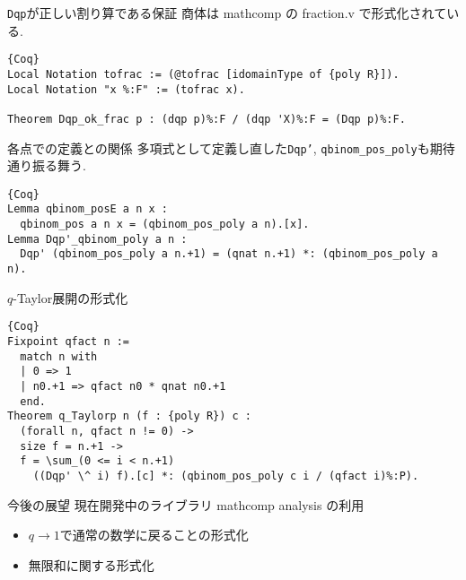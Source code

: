 \documentclass[unicode,mathserif]{beamer}
\begin{document}
\begin{frame}[fragile]
\begin{columns}[T]
\begin{column}{0.33\columnwidth}
\begin{block}{{\tt Dqp}が正しい割り算である保証}
			商体は mathcomp の fraction.v で形式化されている. 
			\begin{lstlisting}{Coq}
Local Notation tofrac := (@tofrac [idomainType of {poly R}]).
Local Notation "x %:F" := (tofrac x).

Theorem Dqp_ok_frac p : (dqp p)%:F / (dqp 'X)%:F = (Dqp p)%:F.
\end{lstlisting}
		\end{block}

		\begin{block}{各点での定義との関係}
			多項式として定義し直した{\tt Dqp'}, {\tt qbinom\_pos\_poly}も期待通り振る舞う.
				\begin{lstlisting}{Coq}
Lemma qbinom_posE a n x :
  qbinom_pos a n x = (qbinom_pos_poly a n).[x].
Lemma Dqp'_qbinom_poly a n :
  Dqp' (qbinom_pos_poly a n.+1) = (qnat n.+1) *: (qbinom_pos_poly a n).
\end{lstlisting}
		\end{block}
		
		\begin{block}{$q$-Taylor展開の形式化}
			\begin{lstlisting}{Coq}
Fixpoint qfact n :=
  match n with
  | 0 => 1
  | n0.+1 => qfact n0 * qnat n0.+1
  end.
Theorem q_Taylorp n (f : {poly R}) c :
  (forall n, qfact n != 0) ->
  size f = n.+1 ->
  f = \sum_(0 <= i < n.+1)
    ((Dqp' \^ i) f).[c] *: (qbinom_pos_poly c i / (qfact i)%:P).
\end{lstlisting}
		\end{block}
		
		\begin{block}{今後の展望}
			現在開発中のライブラリ mathcomp analysis の利用
			\begin{itemize}
				\item $q \to 1$で通常の数学に戻ることの形式化
				\item 無限和に関する形式化
				

\end{itemize}
\end{block}
\end{column}
\end{columns}
\end{frame}
\end{document}
